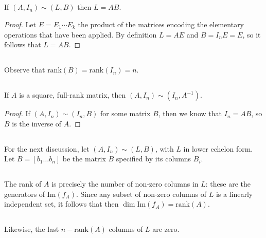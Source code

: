 \documentclass{proc-l}
\theoremstyle{definition}
\theoremstyle{remark}
\numberwithin{equation}{section}
\newcommand{\rank}[1]{\textrm{rank}({#1})}
\newcommand{\im}[1]{\textrm{Im}({#1})}
\begin{document}
\subsection{}
If $(A, I_n) \sim (L, B)$ then $L=AB$.
\begin{proof}
Let $E = E_1\cdots E_k$ the product of the matrices encoding the elementary operations that have been applied. By definition $L = AE$ and $B = I_n E = E$, so it follows that $L=AB$.
\end{proof}

\subsection{}
Observe that $\rank{B} = \rank{I_n} = n$.

\subsection{}
If $A$ is a square, full-rank matrix, then $(A, I_n) \sim (I_n, A^{-1})$.
\begin{proof}
If $(A, I_n) \sim (I_n, B)$ for some matrix $B$, then we know that $I_n = AB$, so $B$ is the inverse of $A$.
\end{proof}

\subsection{}
For the next discussion, let $(A, I_n) \sim (L, B)$, with $L$ in lower echelon form. Let $B=[b_1 \ldots b_n]$ be the matrix $B$ specified by its columns $B_i$.

\subsection{}
The rank of $A$ is precisely the number of non-zero columns in $L$: these are the generators of $\im{f_A}$. Since any subset of non-zero columns of $L$ is a linearly independent set, it follows that then $\dim\im{f_A} = \rank{A}$.

\subsection{}
Likewise, the last $n - \rank{A}$ columns of $L$ are zero.
\end{document}
